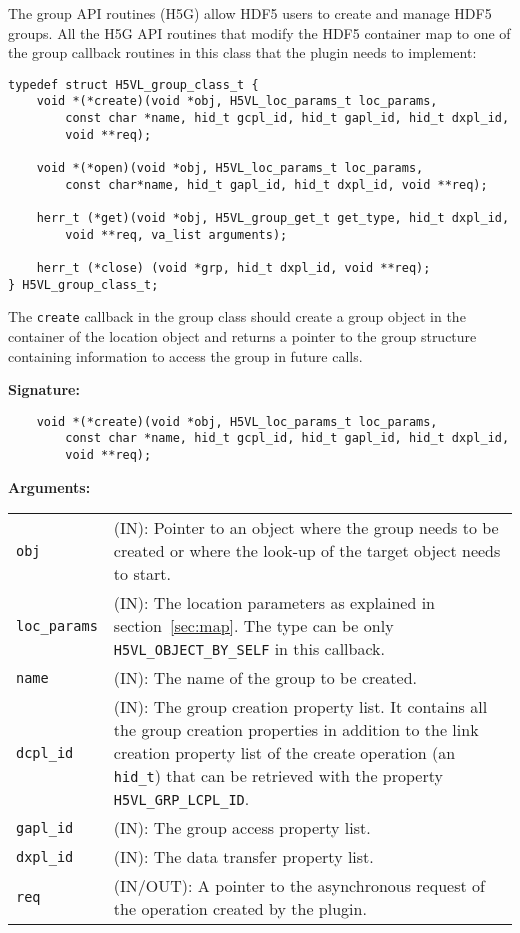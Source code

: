 The group API routines (H5G) allow HDF5 users to create and manage
HDF5 groups. All the H5G API routines that modify the HDF5 container
map to one of the group callback routines in this class that the
plugin needs to implement:

\begin{lstlisting}
typedef struct H5VL_group_class_t {
    void *(*create)(void *obj, H5VL_loc_params_t loc_params, 
        const char *name, hid_t gcpl_id, hid_t gapl_id, hid_t dxpl_id, 
        void **req);

    void *(*open)(void *obj, H5VL_loc_params_t loc_params, 
        const char*name, hid_t gapl_id, hid_t dxpl_id, void **req);

    herr_t (*get)(void *obj, H5VL_group_get_t get_type, hid_t dxpl_id, 
        void **req, va_list arguments);

    herr_t (*close) (void *grp, hid_t dxpl_id, void **req);
} H5VL_group_class_t;
\end{lstlisting}

The {\tt create} callback in the group class should create a group
object in the container of the location object and returns a pointer
to the group structure containing information to access the group in
future calls.

\textbf{Signature:}
\begin{lstlisting}
    void *(*create)(void *obj, H5VL_loc_params_t loc_params, 
        const char *name, hid_t gcpl_id, hid_t gapl_id, hid_t dxpl_id, 
        void **req);
\end{lstlisting}

\textbf{Arguments:}\\
\begin{tabular}{l p{10cm}}
  {\tt obj} & (IN): Pointer to an object where the group needs
  to be created or where the look-up of the target object needs to
  start.\\
  {\tt loc\_params} & (IN): The location parameters as explained in
  section~\ref{sec:map}. The type can be only {\tt
    H5VL\_OBJECT\_BY\_SELF} in this callback. \\
  {\tt name} & (IN): The name of the group to be created.\\
  {\tt dcpl\_id} & (IN): The group creation property list. It contains
  all the group creation properties in addition to the link creation
  property list of the create operation (an {\tt hid\_t}) that can be
  retrieved with the property {\tt H5VL\_GRP\_LCPL\_ID}.\\
  {\tt gapl\_id} & (IN): The group access property list.\\
  {\tt dxpl\_id} & (IN): The data transfer property list.\\
  {\tt req} & (IN/OUT): A pointer to the asynchronous request of the
  operation created by the plugin.\\
\end{tabular}

